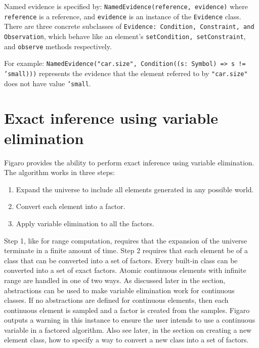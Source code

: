 Named evidence is specified by:
\newline \texttt{NamedEvidence(reference, evidence)}
\newline where \texttt{reference} is a reference, and \texttt{evidence} is an instance of the \texttt{Evidence} class. There are three concrete subclasses of \texttt{Evidence: Condit\-ion, Constraint, and Observation}, which behave like an element's \texttt{setCond\-ition, setConstraint}, and \texttt{observe} methods respectively.

For example:
\newline \texttt{NamedEvidence("car.size", Condition((s: Symbol) => s != 'small\-)))}
\newline represents the evidence that the element referred to by \texttt{"car.size"} does not have value  \texttt{'small}.

\section{Exact inference using variable elimination}

Figaro provides the ability to perform exact inference using variable elimination. The algorithm works in three steps:
\begin{enumerate}
\item Expand the universe to include all elements generated in any possible world.
\item Convert each element into a factor.
\item  Apply variable elimination to all the factors.
\end{enumerate}

Step 1, like for range computation, requires that the expansion of the universe terminate in a finite amount of time. Step 2 requires that each element be of a class that can be converted into a set of factors. Every built-in class can be converted into a set of exact factors. Atomic continuous elements with infinite range are handled in one of two ways. As discussed later in the section, abstractions can be used to make variable elimination work for continuous classes. If no abstractions are defined for continuous elements, then each continuous element is sampled and a factor is created from the samples. Figaro outputs a warning in this instance to ensure the user intends to use a continuous variable in a factored algorithm. Also see later, in the section on creating a new element class, how to specify a way to convert a new class into a set of factors.

